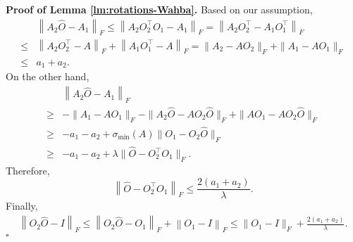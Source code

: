 \documentclass[11pt]{article}
\newcommand{\0}{{\mathbf{0}}}
\newcommand{\1}{{\mathbf{1}}}
\begin{document}
{\bf\noindent Proof of Lemma \ref{lm:rotations-Wahba}.} Based on our assumption,
\begin{equation*}
\begin{split}
& \left\|A_2\hat{O} - A_1\right\|_F \leq \left\| A_2O_2^\top O_1 - A_1 \right\|_F = \left\|A_2O_2^\top  - A_1 O_1^\top \right\|_F\\
\leq & \left\|A_2O_2^\top  - A\right\|_F + \left\|A_1O_1^\top - A \right\|_F = \|A_2 - AO_2\|_F + \|A_1 - AO_1\|_F \\
\leq & a_1+a_2.
\end{split}
\end{equation*}
On the other hand,
\begin{equation*}
\begin{split}
& \left\|A_2\hat{O} - A_1\right\|_F \\
\geq &  -\|A_1 - AO_1\|_F - \|A_2\hat{O} - AO_2 \hat{O}\|_F + \|AO_1 - AO_2\hat{O}\|_F\\
\geq & -a_1 - a_2 + \sigma_{\min}(A) \|O_1 - O_2\hat{O}\|_F\\
\geq & -a_1 -a_2 + \lambda \|\hat{O} - O_2^\top O_1\|_F.
\end{split}
\end{equation*}
Therefore,
\begin{equation*}
\left\|\hat{O} - O_2^\top O_1 \right\|_F\leq \frac{2(a_1+a_2)}{\lambda}.
\end{equation*}
Finally, 
\begin{equation*}
\begin{split}
\left\|O_2 \hat{O} - I\right\|_F \leq \left\|O_2 \hat{O} - O_1 \right\|_F + \left\|O_1 - I \right\|_F \leq \|O_1 - I\|_F + \frac{2(a_1+a_2)}{\lambda}.
\end{split}
\end{equation*}
\quad $\square$
\end{document}
